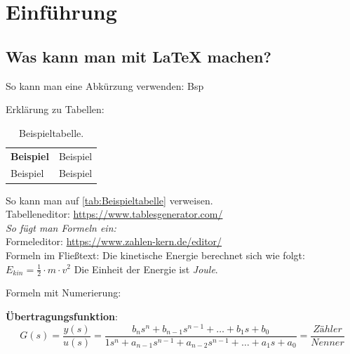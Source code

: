 \section{Einführung}
\label{kap:Einfuehrung}




\newpage
\subsection{Was kann man mit \LaTeX{} machen?}

\par So kann man eine Abkürzung verwenden: \ac{Bsp}

\large{Erklärung zu Tabellen:}\\
\normalsize

\begin{table}[H]
\centering
\caption{Beispieltabelle.}
\label{tab:Beispieltabelle}
\begin{tabular}{ll}
\textbf{Beispiel}                      & Beispiel                      \\ \cline{2-2} 
\multicolumn{1}{l|}{Beispiel} & \multicolumn{1}{l|}{Beispiel} \\ \cline{2-2} 
\end{tabular}
\end{table}

So kann man auf \autoref{tab:Beispieltabelle} verweisen.\\
Tabelleneditor: \url{https://www.tablesgenerator.com/}\\



\Huge{\textit{So fügt man Formeln ein:}}\\
\normalsize
Formeleditor: \url{https://www.zahlen-kern.de/editor/}\\
Formeln im Fließtext: Die kinetische Energie berechnet sich wie folgt: $E_{kin} = \frac{1}{2} \cdot m \cdot v^{2}$ Die Einheit der Energie ist \textit{Joule}.

Formeln mit Numerierung:

\textbf{Übertragungsfunktion}:\\
\begin{equation}
G(s) = \frac{ y(s) }{ u(s) } = \frac{ b_{n}s^{n} + b_{n-1}s^{n-1} + \dots + b_{1}s + b_0 }{ 1s^n + a_{n-1}s^{n-1} + a_{n-2}s^{n-1} + \dots + a_{1}s+ a_0} = \frac{ Zähler }{Nenner}
\label{eq:Uebertragungsfunktion}
\end{equation}

